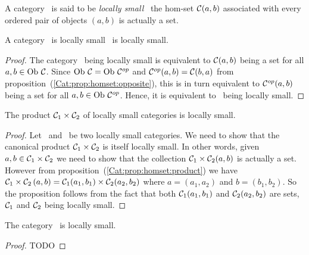 \begin{defin}\label{Cat:def:locally:small}
    A category \Cat\ is said to be {\em locally small} \ifand\ the hom-set
    $\mbox{$\cal C$}(a,b)$ associated with every ordered pair of objects $(a,b)$ is 
    actually a set.
\end{defin}

\begin{prop}\label{Cat:prop:locally:small:opposite}
    A category \Cat\ is locally small \ifand\ \Cop is locally small.
\end{prop}
\begin{proof}
    The category \Cat\ being locally small is equivalent to $\mbox{$\cal C$}(a,b)$
    being a set for all $a,b\in\mbox{\rm Ob}\ \mbox{$\cal C$}$. Since $\mbox{\rm Ob}\ \mbox{$\cal C$}=\mbox{\rm Ob}\ \mbox{${\cal C}^{op}$}$
    and $\mbox{${\cal C}^{op}$}(a,b)=\mbox{$\cal C$}(b,a)$ from 
    proposition~(\ref{Cat:prop:homset:opposite}), this is in turn equivalent 
    to $\mbox{${\cal C}^{op}$}(a,b)$ being a set for all $a,b\in\mbox{\rm Ob}\ \mbox{${\cal C}^{op}$}$. Hence, it is
    equivalent to \Cop\ being locally small.
\end{proof}

\begin{prop}\label{Cat:prop:locally:small:product}
    The product $\mbox{${\cal C}_{1}$}\times\mbox{${\cal C}_{2}$}$ of locally small categories
    is locally small.
\end{prop}
\begin{proof}
    Let \Cone\ and \Ctwo\ be two locally small categories. We need to show that
    the canonical product $\mbox{${\cal C}_{1}$}\times\mbox{${\cal C}_{2}$}$ is itself locally small. In other
    words, given $a,b\in\mbox{${\cal C}_{1}$}\times\mbox{${\cal C}_{2}$}$ we need to show that the collection
    $\mbox{${\cal C}_{1}$}\times\mbox{${\cal C}_{2}$}(a,b)$ is actually a set. However from 
    proposition~(\ref{Cat:prop:homset:product}) we have 
    $\mbox{${\cal C}_{1}$}\times\mbox{${\cal C}_{2}$}\,(a,b)=\mbox{${\cal C}_{1}$}(a_{1},b_{1})\times\mbox{${\cal C}_{2}$}(a_{2},b_{2})$
    where $a=(a_{1},a_{2})$ and $b=(b_{1},b_{2})$. So the proposition
    follows from the fact that both $\mbox{${\cal C}_{1}$}(a_{1},b_{1})$ and 
    $\mbox{${\cal C}_{2}$}(a_{2},b_{2})$ are sets, $\mbox{${\cal C}_{1}$}$ and $\mbox{${\cal C}_{2}$}$ being locally 
    small.
\end{proof}
\begin{prop}\label{Cat:prop:locally:small:set}
    The category \Set\ is locally small.
\end{prop}
\begin{proof}
    TODO
\end{proof}
